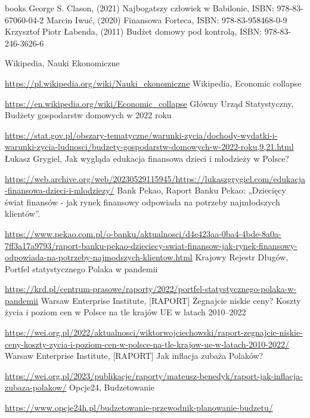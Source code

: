 \documentclass[a4paper,10pt, twoside]{report}
\begin{document}
\begin{large}
\begin{thebibliography} {books}
     George S. Clason, (2021) Najbogatszy człowiek w Babilonie, ISBN: 978-83-67060-04-2
     Marcin Iwuć, (2020) Finansowa Forteca, ISBN: 978-83-958468-0-9
     Krzysztof Piotr Łabenda, (2011) Budżet domowy pod kontrolą, ISBN: 978-83-246-3626-6

     Wikipedia, Nauki Ekonomiczne \raggedright\url{
        https://pl.wikipedia.org/wiki/Nauki_ekonomiczne}
     Wikipedia, Economic collapse \raggedright\url{
        https://en.wikipedia.org/wiki/Economic_collapse}
     Główny Urząd Statystyczny, Budżety gospodarstw domowych w 2022 roku \raggedright\url{
        https://stat.gov.pl/obszary-tematyczne/warunki-zycia/dochody-wydatki-i-warunki-zycia-ludnosci/budzety-gospodarstw-domowych-w-2022-roku,9,21.html}
     Łukasz Grygiel, Jak wygląda edukacja finansowa dzieci i młodzieży w Polsce? \raggedright\url{
        https://web.archive.org/web/20230529115945/https://lukaszgrygiel.com/edukacja-finansowa-dzieci-i-mlodziezy/}
     Bank Pekao, Raport Banku Pekao: „Dziecięcy świat finansów - jak rynek finansowy odpowiada na potrzeby najmłodszych klientów”. \raggedright\url{
        https://www.pekao.com.pl/o-banku/aktualnosci/d4e423aa-0ba4-4bde-8a0a-7ff3a17a9793/raport-banku-pekao-dzieciecy-swiat-finansow-jak-rynek-finansowy-odpowiada-na-potrzeby-najmodszych-klientow.html}
     Krajowy Rejestr Długów, Portfel statystycznego Polaka w pandemii \raggedright\url{
        https://krd.pl/centrum-prasowe/raporty/2022/portfel-statystycznego-polaka-w-pandemii}
     Warsaw Enterprise Institute, [RAPORT] Żegnajcie niskie ceny? Koszty życia i poziom cen w Polsce na tle krajów UE w latach 2010–2022 \raggedright\url{
        https://wei.org.pl/2022/aktualnosci/wiktorwojciechowski/raport-zegnajcie-niskie-ceny-koszty-zycia-i-poziom-cen-w-polsce-na-tle-krajow-ue-w-latach-2010-2022/}
     Warsaw Enterprise Institute, [RAPORT] Jak inflacja zubaża Polaków? \raggedright\url{
        https://wei.org.pl/2023/publikacje/raporty/mateusz-benedyk/raport-jak-inflacja-zubaza-polakow/}
     Opcje24, Budzetowanie \raggedright\url{
        https://www.opcje24h.pl/budzetowanie-przewodnik-planowanie-budzetu/}

\end{thebibliography}
\end{large}
\end{document}
